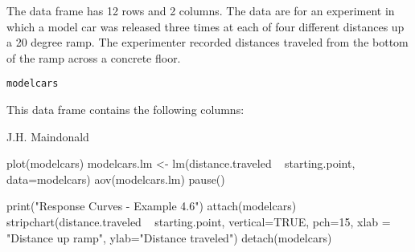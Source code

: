 \begin{Description}\relax
The  data frame has 12 rows and 2 columns.
The data are for an experiment in which a model car was released
three times at each of four different distances up a 20 degree
ramp.  The experimenter recorded distances traveled from the 
bottom of the ramp across a concrete floor.
\end{Description}
\begin{Usage}
\begin{verbatim}modelcars\end{verbatim}
\end{Usage}
\begin{Format}\relax
This data frame contains the following columns:
\end{Format}
\begin{Source}\relax
J.H. Maindonald
\end{Source}
\begin{Examples}
\begin{ExampleCode}
plot(modelcars)
modelcars.lm <- lm(distance.traveled ~ starting.point, data=modelcars)
aov(modelcars.lm)
pause()

print("Response Curves - Example 4.6")
attach(modelcars)
stripchart(distance.traveled ~ starting.point, vertical=TRUE, pch=15,  xlab = "Distance up ramp", ylab="Distance traveled")
detach(modelcars)

\end{ExampleCode}
\end{Examples}

